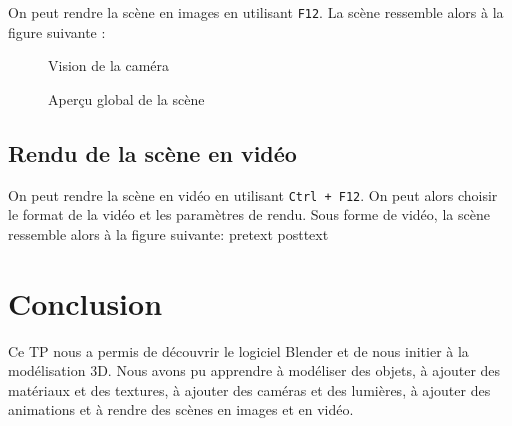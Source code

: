 \documentclass[french,a4paper,10pt]{article}
\begin{document}
    On peut rendre la scène en images en utilisant \texttt{F12}.
    La scène ressemble alors à la figure suivante :
    \begin{figure}[!htb]
        \begin{minipage}{0.48\textwidth}
            \centering
            \caption{Vision de la caméra}\label{Fig:scene-1}
        \end{minipage}\hfill
        \begin{minipage}{0.48\textwidth}
            \centering
            \caption{Aperçu global de la scène}\label{Fig:scene-2}
        \end{minipage}
    \end{figure}

    \subsection{Rendu de la scène en vidéo}\label{subsec:6.2}

    On peut rendre la scène en vidéo en utilisant \texttt{Ctrl + F12}.
    On peut alors choisir le format de la vidéo et les paramètres de rendu.
    Sous forme de vidéo, la scène ressemble alors à la figure suivante:
    pretext
    posttext
    \section{Conclusion}\label{sec:7}

    Ce TP nous a permis de découvrir le logiciel Blender et de nous initier à la modélisation 3D.
    Nous avons pu apprendre à modéliser des objets, à ajouter des matériaux et des textures, à ajouter des caméras et des
    lumières, à ajouter des animations et à rendre des scènes en images et en vidéo.
\end{document}
